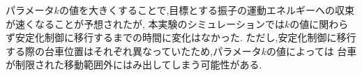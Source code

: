 パラメータ$k$の値を大きくすることで,目標とする振子の運動エネルギーへの収束が速くなることが予想されたが,
本実験のシミュレーションでは$k$の値に関わらず安定化制御に移行するまでの時間に変化はなかった.
ただし,安定化制御に移行する際の台車位置はそれぞれ異なっていたため,パラメータ$k$の値によっては
台車が制限された移動範囲外にはみ出してしまう可能性がある.


